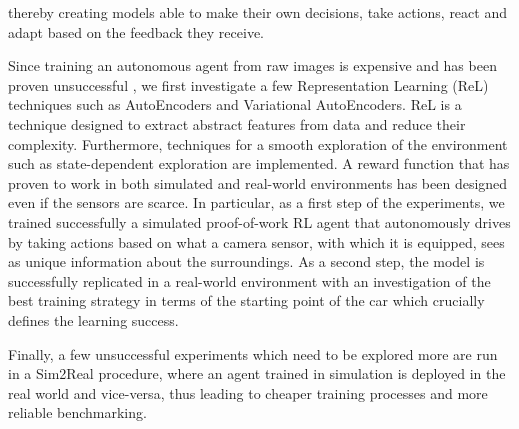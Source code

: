 thereby creating models able to make their own decisions, take actions, react and adapt based on the feedback they receive. 

Since training an autonomous agent from raw images is expensive and has been proven unsuccessful \citep{DBLP:journals/corr/abs-2008-00715}, we first investigate a few Representation Learning (ReL) techniques such as AutoEncoders and Variational AutoEncoders. ReL is a technique designed to extract abstract features from data and reduce their complexity. Furthermore, techniques for a smooth exploration of the environment such as state-dependent exploration are implemented. A reward function that has proven to work in both simulated and real-world environments has been designed even if the sensors are scarce. In particular, as a first step of the experiments, we trained successfully a simulated proof-of-work RL agent that autonomously drives by taking actions based on what a camera sensor, with which it is equipped, sees as unique information about the surroundings. As a second step, the model is successfully replicated in a real-world environment with an investigation of the best training strategy in terms of the starting point of the car which crucially defines the learning success. 

Finally, a few unsuccessful experiments which need to be explored more are run in a Sim2Real procedure, where an agent trained in simulation is deployed in the real world and vice-versa, thus leading to cheaper training processes and more reliable benchmarking. 